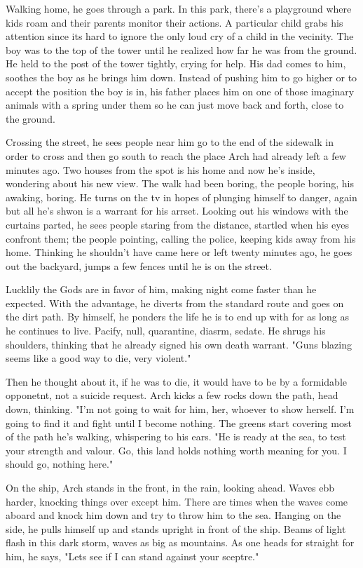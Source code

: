 		Walking home, he goes through a park. In this park, there's a playground where kids roam and their parents monitor their actions. A particular child
	grabs his attention since its hard to ignore the only loud cry of a child in the vecinity. The boy was to the top of the tower until he realized how far he was
	from the ground. He held to the post of the tower tightly, crying for help. His dad comes to him, soothes the boy as he brings him down. Instead of pushing
	him to go higher or to accept the position the boy is in, his father places him on one of those imaginary animals with a spring under them so he can just
	move back and forth, close to the ground.

		Crossing the street, he sees people near him go to the end of the sidewalk in order to cross and then go south to reach the place Arch had already
	left a few minutes ago. Two houses from the spot is his home and now he's inside, wondering about his new view. The walk had been boring, the people boring,
	his awaking, boring. He turns on the tv in hopes of plunging himself to danger, again but all he's shwon is a warrant for his arrset. Looking out his windows
	with the curtains parted, he sees people staring from the distance, startled when his eyes confront them; the people pointing, calling the police, keeping 
	kids away from his home. Thinking he shouldn't have came here or left twenty minutes ago, he goes out the backyard, jumps a few fences until he is on the 
	street.

		Lucklily the Gods are in favor of him, making night come faster than he expected. With the advantage, he diverts from the standard route and goes on
	the dirt path. By himself, he ponders the life he is to end up with for as long as he continues to live. Pacify, null, quarantine, diasrm, sedate. He shrugs
	his shoulders, thinking that he already signed  his own death warrant. "Guns blazing seems like a good way to die, very violent."

		Then he thought about it, if he was to die, it would have to be by a formidable opponetnt, not a suicide request. Arch kicks a few rocks down the path,
	head down, thinking. "I'm not going to wait for him, her, whoever to show herself. I'm going to find it and fight until I become nothing. The greens start
	covering most of the path he's walking, whispering to his ears. "He is ready at the sea, to test your strength and valour. Go, this land holds nothing worth
	meaning for you. I should go, nothing here."

		On the ship, Arch stands in the front, in the rain, looking ahead. Waves ebb harder, knocking things over except him. There are times when the waves
	come aboard and knock him down and try to throw him to the sea. Hanging on the side, he pulls himself up and stands upright in front of the ship. Beams
	of light flash in this dark storm, waves as big as mountains. As one heads for straight for him, he says, "Lets see if I can stand against your sceptre."

